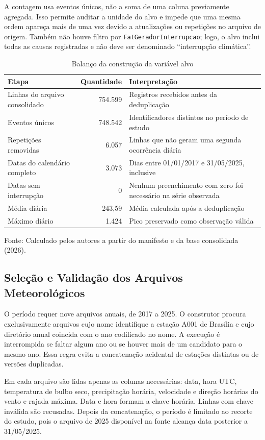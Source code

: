 A contagem usa eventos únicos, não a soma de uma coluna previamente agregada. Isso permite auditar a unidade do alvo e impede que uma mesma ordem apareça mais de uma vez devido a atualizações ou repetições no arquivo de origem. Também não houve filtro por \texttt{FatGeradorInterrupcao}; logo, o alvo inclui todas as causas registradas e não deve ser denominado ``interrupção climática''.

\begin{table}[H]
\centering
\caption{Balanço da construção da variável alvo}
\label{tab:balanco_alvo}
\small
\begin{tabularx}{\textwidth}{X r X}
\toprule
\textbf{Etapa} & \textbf{Quantidade} & \textbf{Interpretação} \\
\midrule
Linhas do arquivo consolidado & 754.599 & Registros recebidos antes da deduplicação \\
Eventos únicos & 748.542 & Identificadores distintos no período de estudo \\
Repetições removidas & 6.057 & Linhas que não geram uma segunda ocorrência diária \\
Datas do calendário completo & 3.073 & Dias entre 01/01/2017 e 31/05/2025, inclusive \\
Datas sem interrupção & 0 & Nenhum preenchimento com zero foi necessário na série observada \\
Média diária & 243,59 & Média calculada após a deduplicação \\
Máximo diário & 1.424 & Pico preservado como observação válida \\
\bottomrule
\end{tabularx}
\small{Fonte: Calculado pelos autores a partir do manifesto e da base consolidada (2026).}
\end{table}

\subsection{Seleção e Validação dos Arquivos Meteorológicos}

O período requer nove arquivos anuais, de 2017 a 2025. O construtor procura exclusivamente arquivos cujo nome identifique a estação A001 de Brasília e cujo diretório anual coincida com o ano codificado no nome. A execução é interrompida se faltar algum ano ou se houver mais de um candidato para o mesmo ano. Essa regra evita a concatenação acidental de estações distintas ou de versões duplicadas.

Em cada arquivo são lidas apenas as colunas necessárias: data, hora UTC, temperatura de bulbo seco, precipitação horária, velocidade e direção horárias do vento e rajada máxima. Data e hora formam a chave horária. Linhas com chave inválida são recusadas. Depois da concatenação, o período é limitado ao recorte do estudo, pois o arquivo de 2025 disponível na fonte alcança data posterior a 31/05/2025.

